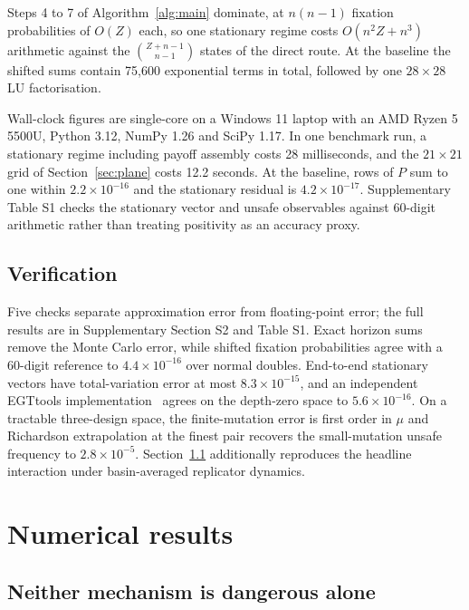 \documentclass[a4paper,fleqn]{cas-sc}
\begin{document}
Steps 4 to 7 of Algorithm~\ref{alg:main} dominate, at $n(n-1)$ fixation
probabilities of $O(Z)$ each, so one stationary regime costs
$O\!\left(n^{2}Z+n^{3}\right)$ arithmetic against the $\binom{Z+n-1}{n-1}$
states of the direct route. At the baseline the shifted sums contain 75,600
exponential terms in total, followed by one $28\times28$ LU factorisation.

Wall-clock figures are single-core on a Windows 11 laptop with an AMD Ryzen 5
5500U, Python 3.12, NumPy 1.26 and SciPy 1.17. In one benchmark run, a
stationary regime including payoff assembly costs 28 milliseconds, and the
$21\times21$ grid of Section~\ref{sec:plane} costs 12.2 seconds. At the
baseline, rows of $P$ sum to one within $2.2\times10^{-16}$ and the stationary
residual is $4.2\times10^{-17}$. Supplementary Table S1 checks the stationary
vector and unsafe observables against 60-digit arithmetic rather than treating
positivity as an accuracy proxy.

\subsection{Verification}
\label{sec:verification}

Five checks separate approximation error from floating-point error; the full
results are in Supplementary Section S2 and Table S1. Exact horizon sums remove
the Monte Carlo error, while shifted fixation probabilities agree with a
60-digit reference to $4.4\times10^{-16}$ over normal doubles. End-to-end
stationary vectors have total-variation error at most $8.3\times10^{-15}$, and
an independent EGTtools implementation~\citep{domingos2023egttools} agrees on
the depth-zero space to $5.6\times10^{-16}$. On a tractable three-design space,
the finite-mutation error is first order in $\mu$ and Richardson extrapolation
at the finest pair recovers the small-mutation unsafe frequency to
$2.8\times10^{-5}$. Section~\ref{sec:decomposition} additionally reproduces the
headline interaction under basin-averaged replicator dynamics.

\section{Numerical results}
\label{sec:results}

\subsection{Neither mechanism is dangerous alone}
\label{sec:decomposition}
\end{document}
